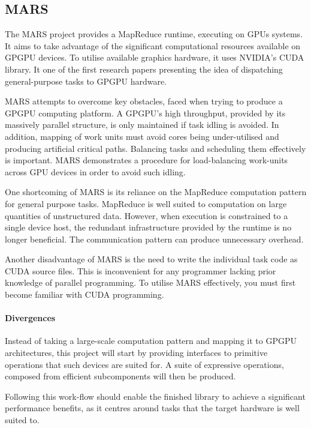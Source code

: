 \subsection{MARS}
The MARS\cite{mars} project provides a MapReduce\cite{mapreduce} runtime, executing on \acp{GPU} systems.
It aims to take advantage of the significant computational resources available on \ac{GPGPU} devices. To utilise available graphics hardware, it uses NVIDIA's \ac{CUDA} library. It one of the first research papers presenting the idea of dispatching general-purpose tasks to \ac{GPGPU} hardware.

MARS attempts to overcome key obstacles, faced when trying to produce a \ac{GPGPU} computing platform.
A \ac{GPGPU}'s high throughput, provided by its massively parallel structure, is only maintained if task idling is avoided. In addition, mapping of work units must avoid cores being under-utilised and producing artificial critical paths. Balancing tasks and scheduling them effectively is important. MARS demonstrates a procedure for load-balancing work-units across \ac{GPU} devices in order to avoid such idling.

One shortcoming of MARS is its reliance on the MapReduce computation pattern for general purpose tasks. MapReduce is well suited to computation on large quantities of unstructured data. However, when execution is constrained to a single device host, the redundant infrastructure provided by the runtime is no longer beneficial. The communication pattern can produce unnecessary overhead.

Another disadvantage of MARS is the need to write the individual task code as \ac{CUDA} source files. This is inconvenient for any programmer lacking prior knowledge of parallel programming. To utilise MARS effectively, you must first become familiar with \ac{CUDA} programming.

\paragraph*{Divergences}
Instead of taking a large-scale computation pattern and mapping it to \ac{GPGPU} architectures, this project will start by providing interfaces to primitive operations that such devices are suited for. A suite of expressive operations, composed from efficient subcomponents will then be produced.

Following this work-flow should enable the finished library to achieve a significant performance benefits, as it centres around tasks that the target hardware is well suited to.

